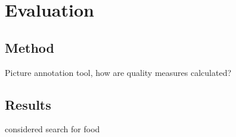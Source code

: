 %
\section{Evaluation}
\label{sec_literatur}

\subsection{Method}
Picture annotation tool, how are quality measures calculated?

\subsection{Results}
considered search for food